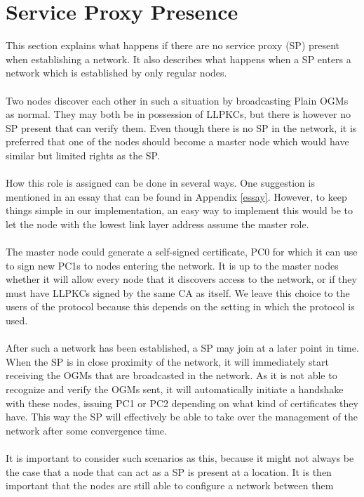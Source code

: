 \section{Service Proxy Presence}
This section explains what happens if there are no service proxy (SP) present when establishing a network. It also describes what happens when a SP enters a network which is established by only regular nodes.
\\\\
Two nodes discover each other in such a situation by broadcasting Plain OGMs as normal. They may both be in possession of LLPKCs, but there is however no SP present that can verify them. Even though there is no SP in the network, it is preferred that one of the nodes should become a master node which would have similar but limited rights as the SP.
\\\\
How this role is assigned can be done in several ways. One suggestion is mentioned in an essay that can be found in Appendix \ref{essay}. However, to keep things simple in our implementation, an easy way to implement this would be to let the node with the lowest link layer address assume the master role.
\\\\
The master node could generate a self-signed certificate, PC0 for which it can use to sign new PC1s to nodes entering the network. It is up to the master nodes whether it will allow every node that it discovers access to the network, or if they must have LLPKCs signed by the same CA as itself. We leave this choice to the users of the protocol because this depends on the setting in which the protocol is used.
\\\\
After such a network has been established, a SP may join at a later point in time. When the SP is in close proximity of the network, it will immediately start receiving the OGMs that are broadcasted in the network. As it is not able to recognize and verify the OGMs sent, it will automatically initiate a handshake with these nodes, issuing PC1 or PC2 depending on what kind of certificates they have. This way the SP will effectively be able to take over the management of the network after some convergence time. 
\\\\
It is important to consider such scenarios as this, because it might not always be the case that a node that can act as a SP is present at a location. It is then important that the nodes are still able to configure a network between them 

